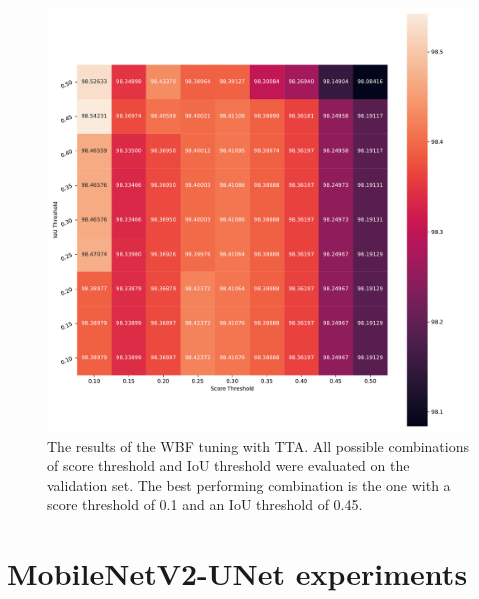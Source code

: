 \begin{figure}
\begin{center}
    \includegraphics[width=\columnwidth]{imgs/yolo_wbf_tta_heat.pdf}
    \caption{The results of the \ac{WBF} tuning with \ac{TTA}. All possible combinations of score threshold and \ac{IoU} threshold were evaluated on the validation set. The best performing combination is the one with a score threshold of 0.1 and an \ac{IoU} threshold of 0.45.}
    \label{fig:wbf_tta_nms_tuning}
\end{center}
\end{figure}

\section{MobileNetV2-UNet experiments}
